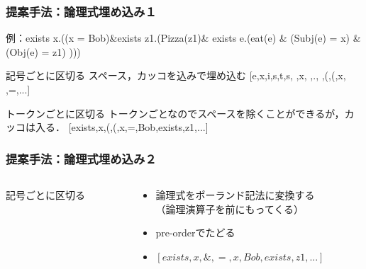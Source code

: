 \documentclass[dvipdfmx,cjk]{beamer}
\begin{document}
\begin{frame}
\frametitle{提案手法：論理式埋め込み１}
例：exists x.((x = Bob)\&exists z1.(Pizza(z1)\& exists e.(eat(e) \& (Subj(e) = x) \& (Obj(e) = z1) )))
\begin{block}{記号ごとに区切る}
  スペース，カッコを込みで埋め込む
  [e,x,i,s,t,s, ,x, ,., ,(,(,x, ,=,...]
\end{block}
\begin{block}{トークンごとに区切る}
  トークンごとなのでスペースを除くことができるが，カッコは入る．
  [exists,x,(,(,x,=,Bob,exists,z1,...]
\end{block}
\end{frame}


\begin{frame}
\frametitle{提案手法：論理式埋め込み２}
\begin{columns}[t]
    \begin{column}{0.5\textwidth} %
      \begin{block}{記号ごとに区切る}
        \begin{figure}[h]
        \begin{center}
        \end{center}
        \end{figure}
      \end{block}
    \end{column}
    \begin{column}{0.5\textwidth} %
      \begin{block}{}
        \begin{itemize}
          \item 論理式をポーランド記法に変換する\\（論理演算子を前にもってくる）
          \item pre-orderでたどる
          \item $[exists,x,\&,=,x,Bob,exists,z1,...]$
        \end{itemize}
      \end{block}
    \end{column}
\end{columns}

\end{frame}
\end{document}
